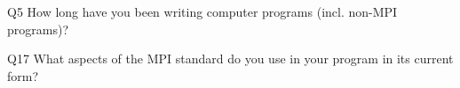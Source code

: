 \begin{description}%
\item{Q5} How long have you been writing computer programs (incl. non-MPI programs)?%
\item{Q17} What aspects of the MPI standard do you use in your program in its current form?%
\end{description}%
